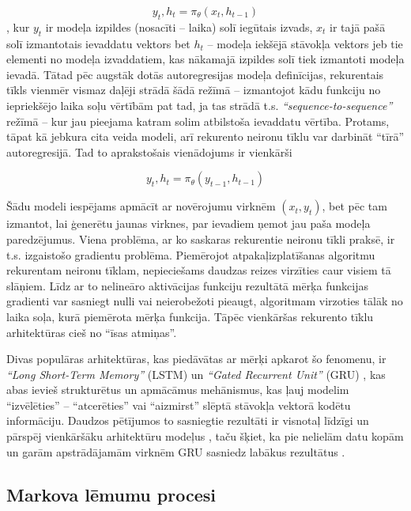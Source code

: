 \documentclass[12pt, a4paper]{article}
\numberwithin{equation}{section} %
\begin{document}
\begin{equation} 
    y_t, h_t = \pi_{\theta}(x_t, h_{t-1})
\end{equation}
, kur $y_t$ ir modeļa izpildes (nosacīti -- laika) solī iegūtais izvads, $x_t$ ir tajā pašā solī izmantotais ievaddatu vektors bet $h_t$ -- modeļa iekšējā stāvokļa vektors jeb tie elementi no modeļa izvaddatiem, kas nākamajā izpildes solī tiek izmantoti modeļa ievadā. Tātad pēc augstāk dotās autoregresijas modeļa definīcijas, rekurentais tīkls vienmēr vismaz daļēji strādā šādā režīmā -- izmantojot kādu funkciju no iepriekšējo laika soļu vērtībām pat tad, ja tas strādā t.s. \textit{``sequence-to-sequence''} režīmā -- kur jau pieejama katram solim atbilstoša ievaddatu vērtība. Protams, tāpat kā jebkura cita veida modeli, arī rekurento neironu tīklu var darbināt ``tīrā'' autoregresijā. Tad to aprakstošais vienādojums ir vienkārši

\begin{equation} 
    y_t, h_t = \pi_{\theta}(y_{t-1}, h_{t-1})
\end{equation}

Šādu modeli iespējams apmācīt ar novērojumu virknēm $(x_t,y_t)$, bet pēc tam izmantot, lai ģenerētu jaunas virknes, par ievadiem ņemot jau paša modeļa paredzējumus. Viena problēma, ar ko saskaras rekurentie neironu tīkli praksē, ir t.s. izgaistošo gradientu problēma. Piemērojot atpakaļizplatīšanas algoritmu rekurentam neironu tīklam, nepieciešams daudzas reizes virzīties caur visiem tā slāņiem. Līdz ar to nelineāro aktivācijas funkciju rezultātā mērķa funkcijas gradienti var sasniegt nulli vai neierobežoti pieaugt, algoritmam virzoties tālāk no laika soļa, kurā piemērota mērķa funkcija. Tāpēc vienkāršas rekurento tīklu arhitektūras cieš no ``īsas atmiņas''. 

Divas populāras arhitektūras, kas piedāvātas ar mērķi apkarot šo fenomenu, ir \textit{``Long Short-Term Memory''} (LSTM) \cite{hochreiter1997long} un \textit{``Gated Recurrent Unit''} (GRU) \cite{cho2014properties}, kas abas ievieš strukturētus un apmācāmus mehānismus, kas ļauj modelim ``izvēlēties'' -- ``atcerēties'' vai ``aizmirst'' slēptā stāvokļa vektorā kodētu informāciju. Daudzos pētījumos to sasniegtie rezultāti ir visnotaļ līdzīgi un pārspēj vienkāršāku arhitektūru modeļus \cite{chung2014empirical}, taču šķiet, ka pie nelielām datu kopām un garām apstrādājamām virknēm GRU sasniedz labākus rezultātus \cite{yang2020lstm}.

\subsection{Markova lēmumu procesi}
\end{document}

